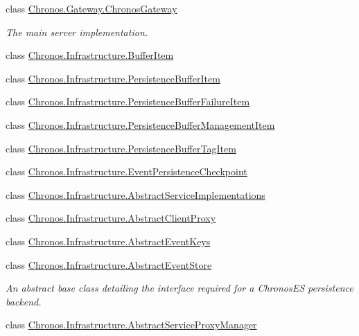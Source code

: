 \begin{DoxyCompactItemize}
class \hyperlink{classChronos_1_1Gateway_1_1ChronosGateway}{Chronos.\+Gateway.\+Chronos\+Gateway}
\begin{DoxyCompactList}\small\item\em The main server implementation. \end{DoxyCompactList}\item 
class \hyperlink{classChronos_1_1Infrastructure_1_1BufferItem}{Chronos.\+Infrastructure.\+Buffer\+Item}
\item 
class \hyperlink{classChronos_1_1Infrastructure_1_1PersistenceBufferItem}{Chronos.\+Infrastructure.\+Persistence\+Buffer\+Item}
\item 
class \hyperlink{classChronos_1_1Infrastructure_1_1PersistenceBufferFailureItem}{Chronos.\+Infrastructure.\+Persistence\+Buffer\+Failure\+Item}
\item 
class \hyperlink{classChronos_1_1Infrastructure_1_1PersistenceBufferManagementItem}{Chronos.\+Infrastructure.\+Persistence\+Buffer\+Management\+Item}
\item 
class \hyperlink{classChronos_1_1Infrastructure_1_1PersistenceBufferTagItem}{Chronos.\+Infrastructure.\+Persistence\+Buffer\+Tag\+Item}
\item 
class \hyperlink{classChronos_1_1Infrastructure_1_1EventPersistenceCheckpoint}{Chronos.\+Infrastructure.\+Event\+Persistence\+Checkpoint}
\item 
class \hyperlink{classChronos_1_1Infrastructure_1_1AbstractServiceImplementations}{Chronos.\+Infrastructure.\+Abstract\+Service\+Implementations}
\item 
class \hyperlink{classChronos_1_1Infrastructure_1_1AbstractClientProxy}{Chronos.\+Infrastructure.\+Abstract\+Client\+Proxy}
\item 
class \hyperlink{classChronos_1_1Infrastructure_1_1AbstractEventKeys}{Chronos.\+Infrastructure.\+Abstract\+Event\+Keys}
\item 
class \hyperlink{classChronos_1_1Infrastructure_1_1AbstractEventStore}{Chronos.\+Infrastructure.\+Abstract\+Event\+Store}
\begin{DoxyCompactList}\small\item\em An abstract base class detailing the interface required for a Chronos\+ES persistence backend. \end{DoxyCompactList}\item 
class \hyperlink{classChronos_1_1Infrastructure_1_1AbstractServiceProxyManager}{Chronos.\+Infrastructure.\+Abstract\+Service\+Proxy\+Manager}
\item 

\end{DoxyCompactItemize}
